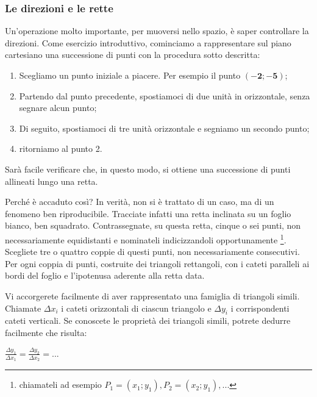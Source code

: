 \subsubsection*{Le direzioni e le rette}

Un'operazione molto importante, per muoversi nello spazio, è saper controllare la direzioni.\newline
Come esercizio introduttivo, cominciamo a rappresentare sul piano cartesiano una successione di punti con la procedura sotto descritta:
\begin{enumerate}
\item {Scegliamo un punto iniziale a piacere. Per esempio il punto $\mathbf {(-2;-5)}$;}
\item {Partendo dal punto precedente, spostiamoci di due unità in orizzontale, senza segnare alcun punto;}
\item {Di seguito, spostiamoci di tre unità orizzontale e segniamo un secondo punto;}
\item {ritorniamo al punto 2.}
\end{enumerate}
Sarà facile verificare che, in questo modo, si ottiene una successione di punti allineati lungo una retta.\newline

Perché è accaduto così? In verità, non si è trattato di un caso, ma di un fenomeno ben riproducibile.\newline
Tracciate infatti una retta inclinata su un foglio bianco, ben squadrato.\newline
Contrassegnate, su questa retta, cinque o sei punti, non necessariamente equidistanti e nominateli indicizzandoli opportunamente \footnote{chiamateli ad esempio $P_1=(x_1;y_1),P_2=(x_2;y_1),...$ }.\newline
Scegliete tre o quattro coppie di questi punti, non necessariamente consecutivi.\newline
Per ogni coppia di punti, costruite dei triangoli rettangoli, con i cateti paralleli ai bordi del foglio e l'ipotenusa aderente alla retta data.

Vi accorgerete facilmente di aver rappresentato una famiglia di triangoli simili.\newline
Chiamate $\Delta x_i$ i cateti orizzontali di ciascun triangolo e $\Delta y_i$ i corrispondenti cateti verticali.
Se conoscete le proprietà dei triangoli simili, potrete dedurre facilmente che risulta:
\begin{center}
\begin{math}
\frac{\Delta y_1}{\Delta x_1} = \frac{\Delta y_2}{\Delta x_2} = ...
\end{math}
\end{center}

